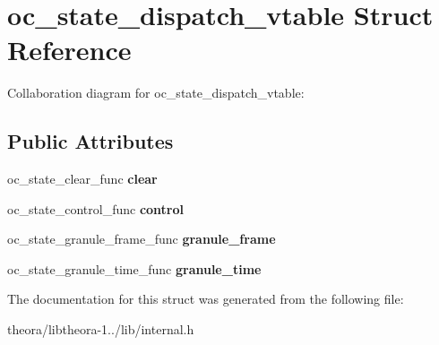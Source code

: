 \hypertarget{structoc__state__dispatch__vtable}{\section{oc\+\_\+state\+\_\+dispatch\+\_\+vtable Struct Reference}
\label{structoc__state__dispatch__vtable}
}


Collaboration diagram for oc\+\_\+state\+\_\+dispatch\+\_\+vtable\+:
\subsection*{Public Attributes}
\begin{DoxyCompactItemize}
\item 
\hypertarget{structoc__state__dispatch__vtable_ad4c2f896185f0fd89582fe1f5f8132b8}{oc\+\_\+state\+\_\+clear\+\_\+func {\bfseries clear}}\label{structoc__state__dispatch__vtable_ad4c2f896185f0fd89582fe1f5f8132b8}

\item 
\hypertarget{structoc__state__dispatch__vtable_ae79d9de391d4052719aa67c49423a41e}{oc\+\_\+state\+\_\+control\+\_\+func {\bfseries control}}\label{structoc__state__dispatch__vtable_ae79d9de391d4052719aa67c49423a41e}

\item 
\hypertarget{structoc__state__dispatch__vtable_af7407c9245b601d7f1dc6a4fa0ce71df}{oc\+\_\+state\+\_\+granule\+\_\+frame\+\_\+func {\bfseries granule\+\_\+frame}}\label{structoc__state__dispatch__vtable_af7407c9245b601d7f1dc6a4fa0ce71df}

\item 
\hypertarget{structoc__state__dispatch__vtable_a84022c3762db6ae47945379824866c28}{oc\+\_\+state\+\_\+granule\+\_\+time\+\_\+func {\bfseries granule\+\_\+time}}\label{structoc__state__dispatch__vtable_a84022c3762db6ae47945379824866c28}

\end{DoxyCompactItemize}


The documentation for this struct was generated from the following file\+:\begin{DoxyCompactItemize}
\item 
theora/libtheora-\/1../lib/internal.\+h\end{DoxyCompactItemize}
